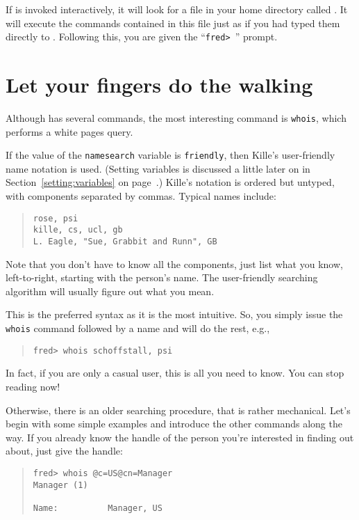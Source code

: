 If  is invoked interactively,
it will look for a file in your home directory called .
It will execute the commands contained in this file just as if you had typed
them directly to .
Following this,
you are given the ``\verb"fred> "'' prompt.

\section	{Let your fingers do the walking}
Although  has several commands,
the most interesting command is \verb"whois",
which performs a white pages query.

If the value of the \verb"namesearch" variable is \verb"friendly",
then Kille's user-friendly name notation is used.
(Setting variables is discussed a little later on in
Section~\ref{setting:variables} on page~\pageref{setting:variables}.)
Kille's notation is ordered but untyped,
with components separated by commas.
Typical names include:
\begin{quote}\small\begin{verbatim}
rose, psi
kille, cs, ucl, gb
L. Eagle, "Sue, Grabbit and Runn", GB
\end{verbatim}\end{quote}
Note that you don't have to know all the components,
just list what you know, left-to-right,
starting with the person's name.
The user-friendly searching algorithm will usually figure out what you mean.

This is the preferred syntax as it is the most intuitive.
So,
you simply issue the \verb"whois" command followed by a name
and  will do the rest,
e.g.,
\begin{quote}\small\begin{verbatim}
fred> whois schoffstall, psi
\end{verbatim}\end{quote}
In fact,
if you are only a casual user,
this is all you need to know.
You can stop reading now!

Otherwise,
there is an older searching procedure,
that is rather mechanical.
Let's begin with some simple examples and introduce the other commands along
the way.
If you already know the handle of the person you're interested in finding out
about,
just give the handle:
\begin{quote}\smaller\begin{verbatim}
fred> whois @c=US@cn=Manager
Manager (1)

Name:          Manager, US
\end{verbatim}\end{quote}

